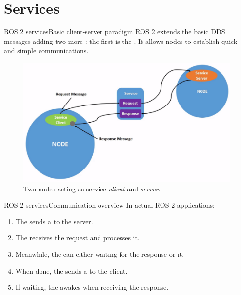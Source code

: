 
\section{Services}
\graphicspath{{figs/section2/}}

\begin{frame}{ROS 2 services}{Basic client-server paradigm}
  ROS 2 extends the basic DDS messages adding two more : the first is the . It allows nodes to establish quick and simple  communications.
  \begin{figure}
    \centering
    \includegraphics[scale=.33]{ros2Srv.png}
    \caption{Two nodes acting as service \emph{client} and \emph{server}.}
    \label{fig:ros2srv}
  \end{figure}
\end{frame}
\begin{frame}{ROS 2 services}{Communication overview}
  In actual ROS 2 applications:
  \begin{enumerate}
    \item The  sends a  to the server.
    \item The  receives the request and processes it.
    \item Meanwhile, the  can either  waiting for the response or  it.
    \item When done, the  sends a  to the client.
    \item If waiting, the  awakes when receiving the response.
  \end{enumerate}
\end{frame}
